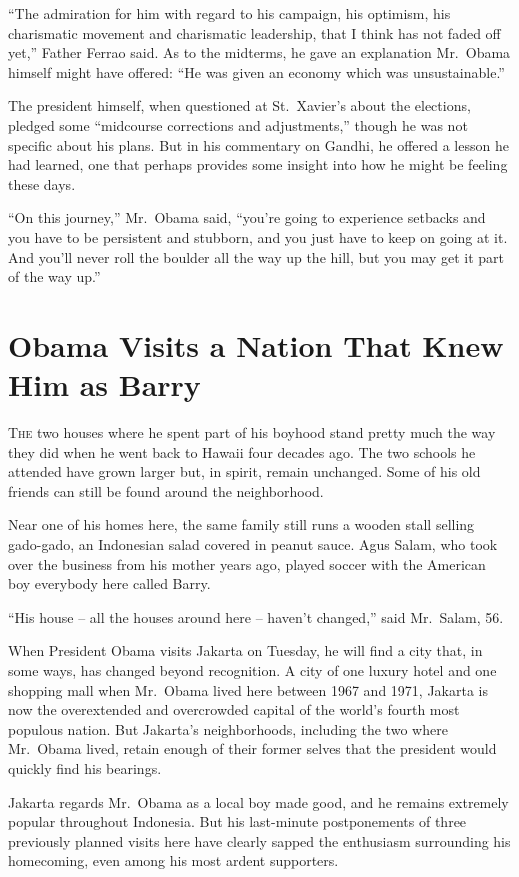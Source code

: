 ﻿\documentclass[12pt]{article}
\begin{document}
``The admiration for him with regard to his campaign, his optimism, his charismatic movement and
charismatic leadership, that I think has not faded off yet,'' Father Ferrao said. As to the
midterms, he gave an explanation Mr.~Obama himself might have offered: ``He was given an economy
which was unsustainable.''

The president himself, when questioned at St.~Xavier's about the elections, pledged some ``midcourse
corrections and adjustments,'' though he was not specific about his plans. But in his commentary on
Gandhi, he offered a lesson he had learned, one that perhaps provides some insight into how he might
be feeling these days.

``On this journey,'' Mr.~Obama said, ``you're going to experience setbacks and you have to be
persistent and stubborn, and you just have to keep on going at it. And you'll never roll the boulder
all the way up the hill, but you may get it part of the way up.''

\section{Obama Visits a Nation That Knew Him as Barry}

\lettrine{T}{he} two houses where he spent part of his boyhood stand pretty
much the way they did when he went back to Hawaii four decades ago. The two schools he attended have
grown larger but, in spirit, remain unchanged. Some of his old friends can still be found around the
neighborhood.

Near one of his homes here, the same family still runs a wooden stall selling gado-gado, an
Indonesian salad covered in peanut sauce. Agus Salam, who took over the business from his mother
years ago, played soccer with the American boy everybody here called Barry.

``His house -- all the houses around here -- haven't changed,'' said Mr.~Salam, 56.

When President Obama visits Jakarta on Tuesday, he will find a city that, in some ways, has changed
beyond recognition. A city of one luxury hotel and one shopping mall when Mr.~Obama lived here
between 1967 and 1971, Jakarta is now the overextended and overcrowded capital of the world's fourth
most populous nation. But Jakarta's neighborhoods, including the two where Mr.~Obama lived, retain
enough of their former selves that the president would quickly find his bearings.

Jakarta regards Mr.~Obama as a local boy made good, and he remains extremely popular throughout
Indonesia. But his last-minute postponements of three previously planned visits here have clearly
sapped the enthusiasm surrounding his homecoming, even among his most ardent supporters.
\end{document}
